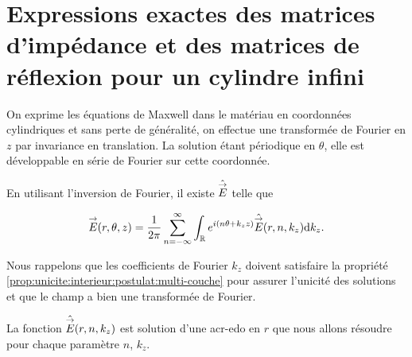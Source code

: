 \section[Opérateur de Calderón pour un cylindre infini]{Expressions exactes des matrices d'impédance et des matrices de réflexion pour un cylindre infini}


  \begin{figure}[!hbt]
    \centering
    \begin{tikzpicture}
      
    \end{tikzpicture}
  \end{figure}

  On exprime les équations de Maxwell dans le matériau en coordonnées cylindriques et sans perte de généralité, on effectue une transformée de Fourier en \(z\) par invariance en translation.
  La solution étant périodique en \(\theta\), elle est développable en série de Fourier sur cette coordonnée.

  En utilisant l'inversion de Fourier, il existe \(\hat\vE\) telle que

  \begin{equation*}
    \vE(r,\theta,z) = \frac{1}{2\pi}\sum_{n=-\infty}^{\infty}\int_{\RR} e^{i(n \theta + k_z z )}\hat{\vE} (r,n,k_z) \dd{k_z}.
  \end{equation*}

  Nous rappelons que les coefficients de Fourier \(k_z\) doivent satisfaire la propriété \ref{prop:unicite:interieur:postulat:multi-couche} pour assurer l'unicité des solutions et que le champ a bien une transformée de Fourier.

  La fonction \(\hat{\vE} (r,n,k_z)\) est solution d'une \gls{acr-edo} en \(r\) que nous allons résoudre pour chaque paramètre \(n\), \(k_z\).

